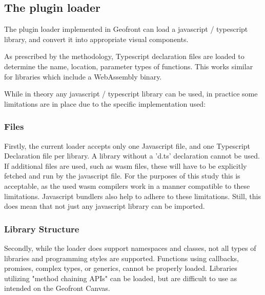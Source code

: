 \subsection{The plugin loader}
\label{sec:implementation:loading:limits}

The plugin loader implemented in Geofront can load a javascript / typescript library, and convert it into appropriate visual components. 

As prescribed by the methodology, Typescript declaration files are loaded to determine the name, location, parameter types of functions. 
This works similar for libraries which include a WebAssembly binary.

While in theory any javascript / typescript library can be used, in practice some limitations are in place due to the specific implementation used:

\subsubsection*{Files}
Firstly, the current loader accepts only one Javascript file, and one Typescript Declaration file per library.
A library without a 'd.ts' declaration cannot be used. 
If additional files are used, such as \ac{wasm} files, these will have to be explicitly fetched and run by the javascript file. 
For the purposes of this study this is acceptable, as the used \ac{wasm} compilers work in a manner compatible to these limitations.
Javascript bundlers also help to adhere to these limitations.
Still, this does mean that not just any javascript library can be imported. 

\subsubsection*{Library Structure}
Secondly, while the loader does support namespaces and classes, not all types of libraries and programming styles are supported. 
Functions using callbacks, promises, complex types, or generics, cannot be properly loaded. 
Libraries utilizing "method chaining APIs" can be loaded, but are difficult to use as intended on the Geofront Canvas.

